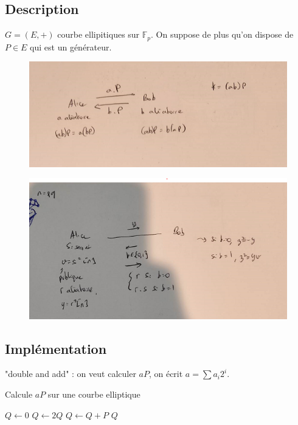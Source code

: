         \subsection{Description}
            $G = (E, +)$ courbe ellipitiques sur $\mathbb{F}_p$. On suppose de plus qu'on dispose de $P \in E$ qui est un générateur.
            \begin{figure}[H]
                \centering
                \includegraphics[width=.5\textwidth]{pictures/2_1}
            \end{figure} \noindent
            \begin{figure}[H]
                \centering
                \includegraphics[width=.5\textwidth]{pictures/2_2}
            \end{figure} \noindent

        \subsection{Implémentation}
            "double and add" : on veut calculer $aP$, on écrit $a = \sum a_i2^i$.
            \begin{algorithm}
                \caption{Calcule $aP$ sur une courbe elliptique}
                \begin{algorithmic}
                        \State $Q \gets 0$
                            \State $Q \gets 2Q$
                                \State $Q \gets Q + P$
                            \EndIf
                        \EndFor
                        \State \Return $Q$
                    \EndFunction
                \end{algorithmic}
            \end{algorithm}
            
